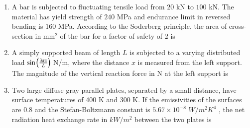 \documentclass[journal]{IEEEtran}
\begin{document}
\begin{enumerate}[leftmargin=0pt]
\item A bar is subjected to fluctuating tensile load from $20$ kN to $100$ kN. The material has yield strength of $240$ MPa and endurance limit in reversed bending is $160$ MPa. According to the Soderberg principle, the area of cross-section in mm$^2$ of the bar for a factor of safety of $2$ is
\begin{enumerate}
\end{enumerate}
\hfill{}

\item A simply supported beam of length $L$ is subjected to a varying distributed load $\sin\left(\frac{3 \pi x}{L}\right)$ N/m, where the distance $x$ is measured from the left support. The magnitude of the vertical reaction force in N at the left support is
\begin{enumerate}
\end{enumerate}
\hfill{}

\item Two large diffuse gray parallel plates, separated by a small distance, have surface temperatures of $400$ K and $300$ K. If the emissivities of the surfaces are $0.8$ and the Stefan-Boltzmann constant is $5.67 \times 10^{-8}$ $W/m^2K^4$ , the net radiation heat exchange rate in $kW/m^2$ between the two plates is
\begin{enumerate}
\end{enumerate}
\hfill{}


\end{enumerate}
\end{document}
